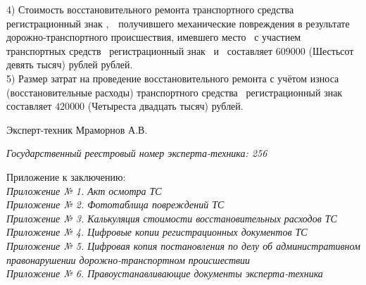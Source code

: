     4)  Стоимость восстановительного ремонта  транспортного средства \tc\, регистрационный знак ,\, \, получившего механические повреждения в результате дорожно-транспортного происшествия, имевшего место \, с участием транспортных средств \, регистрационный знак \, и \tcb\, составляет $ 609 000 $ (Шестьсот девять тысяч) рублей рублей.\\[3mm]
    
    5) Размер затрат на проведение восстановительного ремонта с учётом износа (восстановительные расходы) транспортного средства \tc\, регистрационный знак \grz\, составляет $ 420 000 $ (Четыреста двадцать тысяч) рублей.\\[3mm]
    
    
    
    
\vspace{15mm}

 \noindent Эксперт-техник   \hfill        Мраморнов А.В.
 
\vspace{3mm}
\noindent   \textit{  Государственный  реестровый номер эксперта-техника:   256}\\

\vspace{6mm}

\relax
\noindent Приложение к заключению:\\
\textit{
    Приложение № 1. Акт осмотра ТС \\
    Приложение № 2. Фототаблица повреждений ТС\\
	Приложение № 3. Калькуляция стоимости восстановительных расходов ТС \\
	Приложение № 4. Цифровые копии регистрационных документов ТС\\
	Приложение № 5. Цифровая копия постановления по делу об административном правонарушении дорожно-транспортном происшествии\\
	Приложение № 6. Правоустанавливающие документы эксперта-техника\\
}

%
%